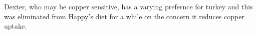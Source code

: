 \begin{comment}
\begin{figure}[ht]
\begin{align}
\cee{H2O &<=> H^{+}_{(aq)} + OH^{-}_{(aq)}} \\
\cee{Cl_{2} + 2OH^{-}  & <=> Cl^{-} + O-Cl + H_{2}O_{l} \label{r:ecbleach} } \\
\cee{Cl_{2} + 2NaOH & -> NaCl + NaClO + H_{2}O \label{r:hypochlorate}}\\
\cee{NaCl + 3H_{2}O & <=> NaClO_3 + 3H_2 \label{r:chlorate}} \\
\cee{ H_{2}O_{2} + NaClO & -> NaCl + H_{2}O + O_{2} \label{r:bleachperoxide}}\\
\end{align}
\caption{ \label{fig:reacts} test to see how chemfig works.  wtf is outer par mode?  Some reactions thought to be relevant to generation, decay, and
efficacy of electrolyzed water solutions. }
\end{figure}

\end{comment}

Dexter, who may be copper sensitive, has a varying prefernce
for turkey and this was eliminated from Happy's diet for a while
on the concern it reduces copper uptake.


